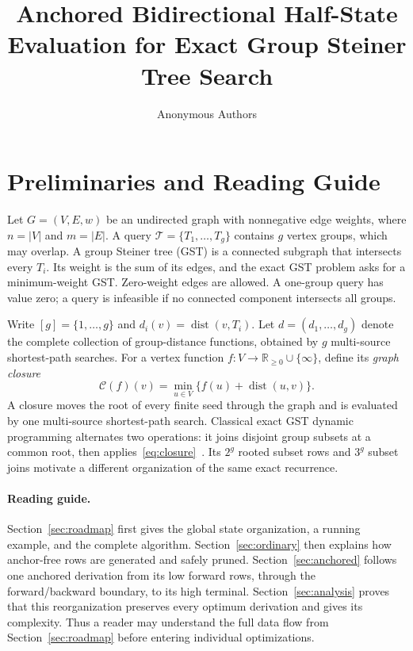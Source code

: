 \documentclass[sigconf,nonacm]{acmart}
\title{Anchored Bidirectional Half-State Evaluation for Exact Group Steiner Tree Search}
\author{Anonymous Authors}
\affiliation{\institution{Anonymous Institution}\city{Anonymous City}\country{Anonymous}}
\newcommand{\dist}{\operatorname{dist}}
\newcommand{\Clos}{\mathcal{C}}
\begin{document}
\maketitle

\section{Preliminaries and Reading Guide}
\label{sec:prelim}

Let $G=(V,E,w)$ be an undirected graph with nonnegative edge weights, where $n=|V|$ and $m=|E|$.  A query $\mathcal{T}=\{T_1,\ldots,T_g\}$ contains $g$ vertex groups, which may overlap.  A group Steiner tree (GST) is a connected subgraph that intersects every $T_i$.  Its weight is the sum of its edges, and the exact GST problem asks for a minimum-weight GST.  Zero-weight edges are allowed.  A one-group query has value zero; a query is infeasible if no connected component intersects all groups.

Write $[g]=\{1,\ldots,g\}$ and $d_i(v)=\dist(v,T_i)$.  Let $d=(d_1,\ldots,d_g)$ denote the complete collection of group-distance functions, obtained by $g$ multi-source shortest-path searches.  For a vertex function $f:V\rightarrow\mathbb{R}_{\geq0}\cup\{\infty\}$, define its \emph{graph closure}
\begin{equation}
  \Clos(f)(v)=\min_{u\in V}\{f(u)+\dist(u,v)\}.
  \label{eq:closure}
\end{equation}
A closure moves the root of every finite seed through the graph and is evaluated by one multi-source shortest-path search.  Classical exact GST dynamic programming alternates two operations: it joins disjoint group subsets at a common root, then applies~\eqref{eq:closure}~\cite{dreyfus1971,pruneddp}.  Its $2^g$ rooted subset rows and $3^g$ subset joins motivate a different organization of the same exact recurrence.

\paragraph{Reading guide.}
Section~\ref{sec:roadmap} first gives the global state organization, a running example, and the complete algorithm.  Section~\ref{sec:ordinary} then explains how anchor-free rows are generated and safely pruned.  Section~\ref{sec:anchored} follows one anchored derivation from its low forward rows, through the forward/backward boundary, to its high terminal.  Section~\ref{sec:analysis} proves that this reorganization preserves every optimum derivation and gives its complexity.  Thus a reader may understand the full data flow from Section~\ref{sec:roadmap} before entering individual optimizations.
\end{document}
